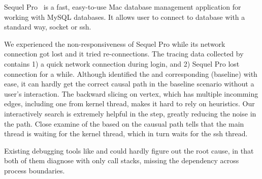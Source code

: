 Sequel Pro~\cite{SequelPro} is a fast, easy-to-use Mac database management
application for working with MySQL databases. It allows user to connect to
database with a standard way, socket or ssh.

We experienced the non-responsiveness of Sequel Pro while its network connection
got lost and it tried re-connections. The tracing data collected by \xxx
contains 1) a quick network connection during login, and 2) Sequel Pro lost
connection for a while. Although \xxx identified the \spinningnode and
corresponding (baseline) \similarnode with ease, it can hardly get the correct
causal path in the baseline scenario without a user's interaction. The backward
slicing on vertex, which has multiple incomming edges, including one from
kernel thread, makes it hard to rely on heuristics. Our interactively search is
extremely helpful in the step, greatly reducing the noise in the path. Close
examine of the \spinningnode based on the causual path tells that the main
thread is waiting for the kernel thread, which in turn waits for the ssh thread.


Existing debugging tools like  and  could hardly figure
out the root cause, in that both of them diagnose with only call stacks, missing
the dependency across process boundaries.
